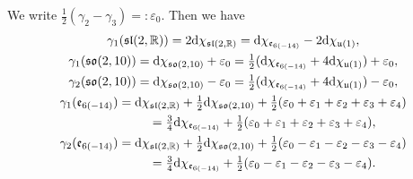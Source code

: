 \documentclass[pdftex]{sigma}
\numberwithin{equation}{section}
\newcommand{\BR}{\mathbb{R}}
\newcommand{\ve}{\varepsilon}
\begin{document}
We write $\frac{1}{2}(\gamma_2-\gamma_3)=:\ve_0$. Then we have
\begin{gather*}
\gamma_1(\mathfrak{sl}(2,\BR)) =2{\rm d}\chi_{\mathfrak{sl}(2,\BR)}={\rm d}\chi_{\mathfrak{e}_{6(-14)}}-2{\rm d}\chi_{\mathfrak{u}(1)},\\
\gamma_1(\mathfrak{so}(2,10)) ={\rm d}\chi_{\mathfrak{so}(2,10)}+\ve_0=\tfrac{1}{2}({\rm d}\chi_{\mathfrak{e}_{6(-14)}}+4{\rm d}\chi_{\mathfrak{u}(1)})+\ve_0,\\
\gamma_2(\mathfrak{so}(2,10)) ={\rm d}\chi_{\mathfrak{so}(2,10)}-\ve_0=\tfrac{1}{2}({\rm d}\chi_{\mathfrak{e}_{6(-14)}}+4{\rm d}\chi_{\mathfrak{u}(1)})-\ve_0,\\
\gamma_1(\mathfrak{e}_{6(-14)}) ={\rm d}\chi_{\mathfrak{sl}(2,\BR)}+\tfrac12 {{\rm d}\chi_{\mathfrak{so}(2,10)}} +\tfrac{1}{2}(\ve_0+\ve_1+\ve_2+\ve_3+\ve_4)\\
\hphantom{\gamma_1(\mathfrak{e}_{6(-14)})}{} =\tfrac{3}{4}{\rm d}\chi_{\mathfrak{e}_{6(-14)}}+\tfrac{1}{2}(\ve_0+\ve_1+\ve_2+\ve_3+\ve_4),\\
\gamma_2(\mathfrak{e}_{6(-14)}) ={\rm d}\chi_{\mathfrak{sl}(2,\BR)}+\tfrac12 {{\rm d}\chi_{\mathfrak{so}(2,10)}}+\tfrac{1}{2}(\ve_0-\ve_1-\ve_2-\ve_3-\ve_4)\\
 \hphantom{\gamma_2(\mathfrak{e}_{6(-14)})}{} =\tfrac{3}{4}{\rm d}\chi_{\mathfrak{e}_{6(-14)}}+\tfrac{1}{2}(\ve_0-\ve_1-\ve_2-\ve_3-\ve_4).
\end{gather*}
\end{document}
